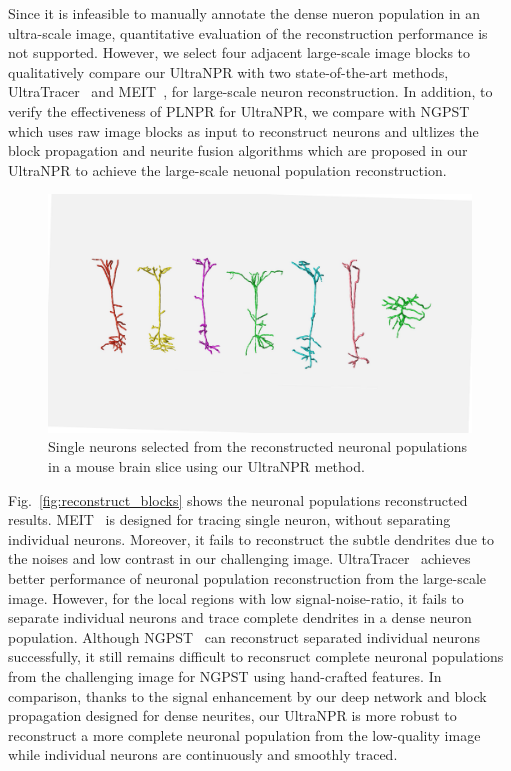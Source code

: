 Since it is infeasible to manually annotate the dense nueron population in an ultra-scale image, quantitative evaluation of the reconstruction performance is not supported.
%
However, we select four adjacent large-scale image blocks to qualitatively compare our UltraNPR with two state-of-the-art methods, UltraTracer~\cite{Peng2017} and MEIT~\cite{Wang2018}, for large-scale neuron reconstruction.
In addition, to verify the effectiveness of PLNPR for UltraNPR, we compare with NGPST~\cite{Quan2015} which uses raw image blocks as input to reconstruct neurons and ultlizes the block propagation and neurite fusion algorithms which are proposed in our UltraNPR to achieve the large-scale neuonal population reconstruction.
%

\begin{figure}[t]
	\centering
	\includegraphics[width=\columnwidth]{./Illustrations/single_neurons4.pdf}
	\caption{Single neurons selected from the reconstructed neuronal populations in a mouse brain slice using our UltraNPR method.}
	\label{fig:single_neurons}
\end{figure}

Fig.~\ref{fig:reconstruct_blocks} shows the neuronal populations reconstructed results.
%
MEIT~\cite{Wang2018} is designed for tracing single neuron, without separating individual neurons. 
Moreover, it fails to reconstruct the subtle dendrites due to the noises and low contrast in our challenging image.
% 
UltraTracer~\cite{Peng2017} achieves better performance of neuronal population reconstruction from the large-scale image. 
However, for the local regions with low signal-noise-ratio, it fails to separate individual neurons and trace complete dendrites in a dense neuron population.
Although NGPST~\cite{Quan2015} can reconstruct separated individual neurons successfully, it still remains difficult to reconsruct complete neuronal populations from the challenging image for NGPST using hand-crafted features.
In comparison, thanks to the signal enhancement by our deep network and block propagation designed for dense neurites, our UltraNPR is more robust to reconstruct a more complete neuronal population from the low-quality image while individual neurons are continuously and smoothly traced.


